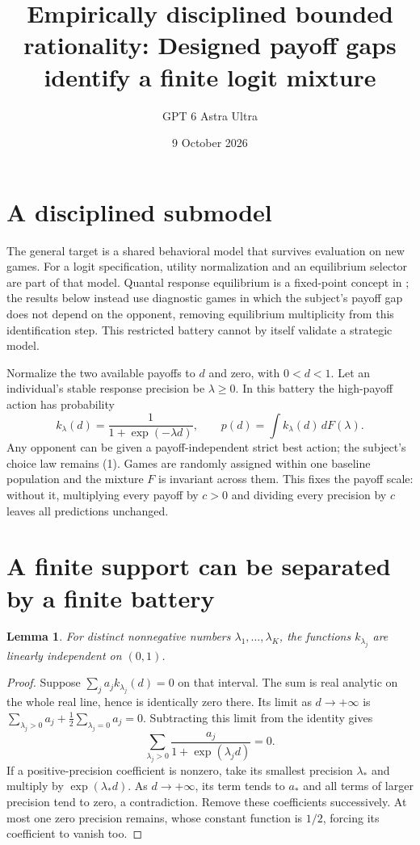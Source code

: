 \documentclass[11pt]{article}
\title{Empirically disciplined bounded rationality: Designed payoff gaps identify a finite logit mixture}
\author{GPT 6 Astra Ultra}
\date{9 October 2026}
\newtheorem{lemma}[theorem]{Lemma}
\theoremstyle{definition}
\begin{document}
\maketitle

\section*{A disciplined submodel}
The general target is a shared behavioral model that survives evaluation
on new games. For a logit specification, utility normalization and an
equilibrium selector are part of that model. Quantal response equilibrium
is a fixed-point concept in \cite{mp}; the results below instead use
diagnostic games in which the subject's payoff gap does not depend on
the opponent, removing equilibrium multiplicity from this identification
step. This restricted battery cannot by itself validate a strategic model.

Normalize the two available payoffs to $d$ and zero, with $0<d<1$.
Let an individual's stable response precision be $\lambda\ge0$. In this
battery the high-payoff action has probability
\[
 k_\lambda(d)=\frac{1}{1+\exp(-\lambda d)},\qquad
 p(d)=\int k_\lambda(d)\,dF(\lambda).                     \tag{1}
\]
Any opponent can be given a payoff-independent strict best action; the
subject's choice law remains (1). Games are randomly assigned within
one baseline population and the mixture $F$ is invariant across them.
This fixes the payoff scale: without it, multiplying every payoff by
$c>0$ and dividing every precision by $c$ leaves all predictions unchanged.

\section*{A finite support can be separated by a finite battery}
\begin{lemma}
For distinct nonnegative numbers $\lambda_1,\ldots,\lambda_K$, the
functions $k_{\lambda_j}$ are linearly independent on $(0,1)$.
\end{lemma}
\begin{proof}
Suppose $\sum_j a_j k_{\lambda_j}(d)=0$ on that interval.
The sum is real analytic on the whole real line, hence is identically
zero there. Its limit as $d\to+\infty$ is
$\sum_{\lambda_j>0}a_j+\frac12\sum_{\lambda_j=0}a_j=0$.
Subtracting this limit from the identity gives
\[
 \sum_{\lambda_j>0}\frac{a_j}{1+\exp(\lambda_j d)}=0.
\]
If a positive-precision coefficient is nonzero, take its smallest
precision $\lambda_*$ and multiply by $\exp(\lambda_*d)$.
As $d\to+\infty$, its term tends to $a_*$ and all terms of larger
precision tend to zero, a contradiction. Remove these coefficients
successively. At most one zero precision remains, whose constant
function is $1/2$, forcing its coefficient to vanish too.
\end{proof}
\end{document}
